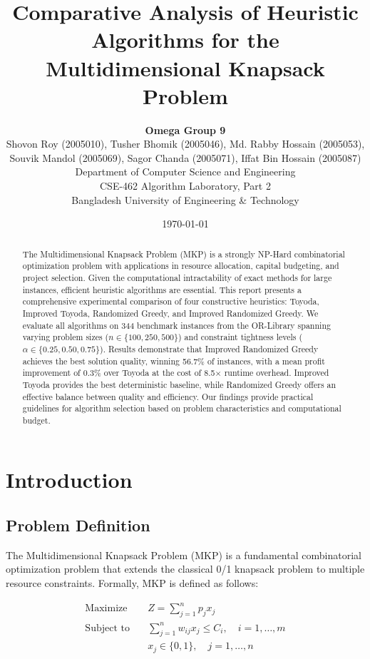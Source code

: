 \documentclass[12pt,a4paper]{article}
\title{\textbf{Comparative Analysis of Heuristic Algorithms for the Multidimensional Knapsack Problem}}
\author{
    \textbf{Omega Group 9} \\[0.5em]
    Shovon Roy (2005010), Tusher Bhomik (2005046), Md. Rabby Hossain (2005053), \\
    Souvik Mandol (2005069), Sagor Chanda (2005071), Iffat Bin Hossain (2005087) \\[0.5em]
    Department of Computer Science and Engineering \\
    CSE-462 Algorithm Laboratory, Part 2 \\
    Bangladesh University of Engineering \& Technology
}
\date{\today}
\begin{document}
\maketitle

\begin{abstract}
The Multidimensional Knapsack Problem (MKP) is a strongly NP-Hard combinatorial optimization problem with applications in resource allocation, capital budgeting, and project selection. Given the computational intractability of exact methods for large instances, efficient heuristic algorithms are essential. This report presents a comprehensive experimental comparison of four constructive heuristics: Toyoda, Improved Toyoda, Randomized Greedy, and Improved Randomized Greedy. We evaluate all algorithms on 344 benchmark instances from the OR-Library spanning varying problem sizes ($n \in \{100, 250, 500\}$) and constraint tightness levels ($\alpha \in \{0.25, 0.50, 0.75\}$). Results demonstrate that Improved Randomized Greedy achieves the best solution quality, winning 56.7\% of instances, with a mean profit improvement of 0.3\% over Toyoda at the cost of 8.5$\times$ runtime overhead. Improved Toyoda provides the best deterministic baseline, while Randomized Greedy offers an effective balance between quality and efficiency. Our findings provide practical guidelines for algorithm selection based on problem characteristics and computational budget.
\end{abstract}

\tableofcontents
\newpage

\section{Introduction}

\subsection{Problem Definition}

The Multidimensional Knapsack Problem (MKP) is a fundamental combinatorial optimization problem that extends the classical 0/1 knapsack problem to multiple resource constraints. Formally, MKP is defined as follows:

\begin{equation}
\begin{aligned}
\text{Maximize} \quad & Z = \sum_{j=1}^{n} p_j x_j \\
\text{Subject to} \quad & \sum_{j=1}^{n} w_{ij} x_j \leq C_i, \quad i = 1, \ldots, m \\
& x_j \in \{0, 1\}, \quad j = 1, \ldots, n
\end{aligned}
\end{equation}
\end{document}

